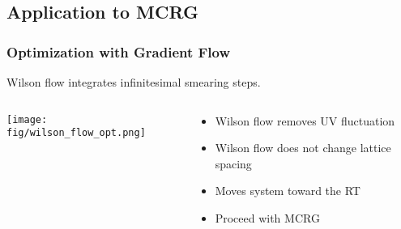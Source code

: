 \subsection{Application to MCRG}
\addtocounter{framenumber}{-1}

\begin{frame}
  \frametitle{Optimization with Gradient Flow}
  Wilson flow integrates infinitesimal smearing steps.
  \begin{columns}[T]
    \begin{column}{.4\textwidth}
      \begin{block}{}
        \texttt{[image: fig/wilson\_flow\_opt.png]}
      \end{block}
    \end{column}
    \begin{column}{.6\textwidth}
      \begin{block}{}
        \begin{itemize}
          \item Wilson flow removes UV fluctuation
          \item Wilson flow does not change lattice spacing
          \item Moves system toward the RT
          \item Proceed with MCRG
        \end{itemize}
      \end{block}
    \end{column}
  \end{columns}
\end{frame}

